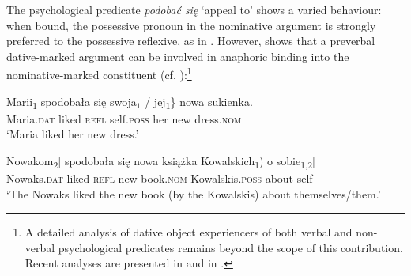 \documentclass[output=paper,modfonts,nonflat
]{langsci/langscibook}
\begin{document}
\noindent The psychological predicate \textit{podobać się} ‘appeal to’ shows a varied behaviour: when bound, the possessive pronoun in the nominative argument is strongly preferred to the possessive reflexive, as in . However, \cite{witkos2007,witkos2008} shows that a preverbal dative-marked argument can be involved in anaphoric binding into the nominative-marked constituent (cf. ):\footnote{\label{fn1}A detailed analysis of dative object experiencers of both verbal and non-verbal psychological predicates remains beyond the scope of this contribution. Recent analyses are presented in \cite{jimenezfernandez2016} and in \cite{bondaruk2017}.}




\ea \label{ex:witkos:3}
    \gll Marii\textsubscript{1} spodobała się  swoja$_1$ / jej\textsubscript{1}\}  nowa sukienka.\\
         Maria.\textsc{dat} liked \textsc{refl} {} self.\textsc{poss} {} her new dress.\textsc{nom}\\
    \glt `Maria liked her new dress.'
\z

\ea \label{ex:witkos:4}
    \gll \minsp{[} Nowakom\textsubscript{2}]   spodobała   się   \minsp{[} nowa książka  \minsp{(} Kowalskich\textsubscript{1}) o sobie\textsubscript{1,2}]\\
        {} Nowaks.\textsc{dat} liked \textsc{refl} {} new book.\textsc{nom} {} Kowalskis.\textsc{poss} about self\\
    \glt `The Nowaks liked the new book (by the Kowalskis) about themselves/them.'
\z
\end{document}
